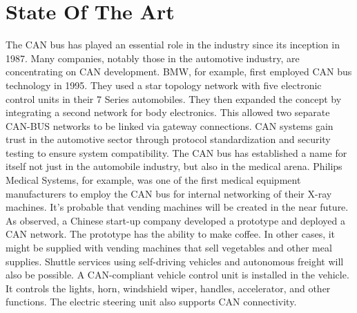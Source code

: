 
\section{State Of The Art}
The CAN bus has played an essential role in the industry since its inception in 1987. Many companies, notably those in the automotive industry, are concentrating on CAN development. BMW, for example, first employed CAN bus technology in 1995. They used a star topology network with five electronic control units in their 7 Series automobiles. They then expanded the concept by integrating a second network for body electronics. This allowed two separate CAN-BUS networks to be linked via gateway connections. CAN systems gain trust in the automotive sector through protocol standardization and security testing to ensure system compatibility. \cite{b5} The CAN bus has established a name for itself not just in the automobile industry, but also in the medical arena. Philips Medical Systems, for example, was one of the first medical equipment manufacturers to employ the CAN bus for internal networking of their X-ray machines. \cite{b6} It's probable that vending machines will be created in the near future. As observed, a Chinese start-up company developed a prototype and deployed a CAN network. The prototype has the ability to make coffee. In other cases, it might be supplied with vending machines that sell vegetables and other meal supplies. Shuttle services using self-driving vehicles and autonomous freight will also be possible. A CAN-compliant vehicle control unit is installed in the vehicle. It controls the lights, horn, windshield wiper, handles, accelerator, and other functions. The electric steering unit also supports CAN connectivity. \cite{b7}